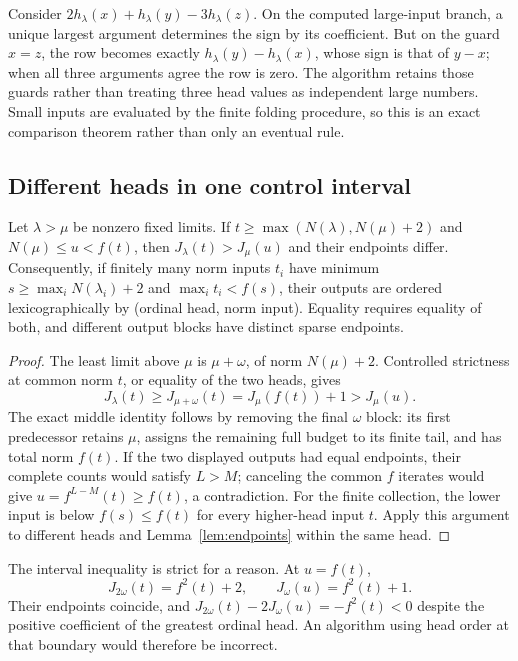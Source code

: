\documentclass[11pt]{article}
\begin{document}
\begin{example}
Consider $2h_\lambda(x)+h_\lambda(y)-3h_\lambda(z)$. On the computed
large-input branch, a unique largest argument determines the sign by its
coefficient. But on the guard $x=z$, the row becomes exactly
$h_\lambda(y)-h_\lambda(x)$, whose sign is that of $y-x$; when all three
arguments agree the row is zero. The algorithm retains those guards rather
than treating three head values as independent large numbers. Small inputs
are evaluated by the finite folding procedure, so this is an exact
comparison theorem rather than only an eventual rule.
\end{example}

\subsection{Different heads in one control interval}
\begin{lemma}\label{lem:head-window}
Let $\lambda>\mu$ be nonzero fixed limits. If
$t\ge\max(N(\lambda),N(\mu)+2)$ and
$N(\mu)\le u<f(t)$, then $J_\lambda(t)>J_\mu(u)$ and their endpoints
differ. Consequently, if finitely many norm inputs $t_i$ have minimum
$s\ge\max_iN(\lambda_i)+2$ and $\max_i t_i<f(s)$, their outputs are
ordered lexicographically by (ordinal head, norm input). Equality requires
equality of both, and different output blocks have distinct sparse endpoints.
\end{lemma}
\begin{proof}
The least limit above $\mu$ is $\mu+\omega$, of norm $N(\mu)+2$.
Controlled strictness at common norm $t$, or equality of the two heads,
gives
\[
 J_\lambda(t)\ge J_{\mu+\omega}(t)
       =J_\mu(f(t))+1>J_\mu(u).
\]
The exact middle identity follows by removing the final $\omega$ block:
its first predecessor retains $\mu$, assigns the remaining full budget
to its finite tail, and has total norm $f(t)$. If the two displayed
outputs had equal endpoints, their complete counts would satisfy
$L>M$; canceling the common $f$ iterates would give
$u=f^{L-M}(t)\ge f(t)$, a contradiction. For the finite collection, the
lower input is below $f(s)\le f(t)$ for every higher-head input $t$.
Apply this argument to different heads and
Lemma~\ref{lem:endpoints} within the same head.
\end{proof}

The interval inequality is strict for a reason. At $u=f(t)$,
\[
 J_{2\omega}(t)=f^2(t)+2,\qquad
 J_\omega(u)=f^2(t)+1.
\]
Their endpoints coincide, and
$J_{2\omega}(t)-2J_\omega(u)=-f^2(t)<0$ despite the positive coefficient
of the greatest ordinal head. An algorithm using head order at that
boundary would therefore be incorrect.
\end{document}
